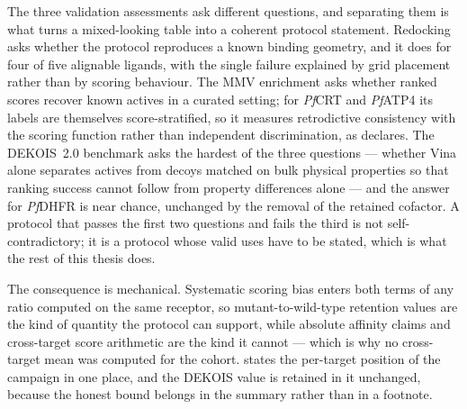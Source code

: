 The three validation assessments ask different questions, and separating them is what turns a mixed-looking table into a coherent protocol statement. Redocking asks whether the protocol reproduces a known binding geometry, and it does for four of five alignable ligands, with the single failure explained by grid placement rather than by scoring behaviour. The MMV enrichment asks whether ranked scores recover known actives in a curated setting; for \emph{Pf}CRT and \emph{Pf}ATP4 its labels are themselves score-stratified, so it measures retrodictive consistency with the scoring function rather than independent discrimination, as  declares. The DEKOIS~2.0 benchmark asks the hardest of the three questions --- whether Vina alone separates actives from decoys matched on bulk physical properties so that ranking success cannot follow from property differences alone --- and the answer for \emph{Pf}DHFR is near chance, unchanged by the removal of the retained cofactor. A protocol that passes the first two questions and fails the third is not self-contradictory; it is a protocol whose valid uses have to be stated, which is what the rest of this thesis does.

The consequence is mechanical. Systematic scoring bias enters both terms of any ratio computed on the same receptor, so mutant-to-wild-type retention values are the kind of quantity the protocol can support, while absolute affinity claims and cross-target score arithmetic are the kind it cannot --- which is why no cross-target mean was computed for the cohort.  states the per-target position of the campaign in one place, and the DEKOIS value is retained in it unchanged, because the honest bound belongs in the summary rather than in a footnote.%

